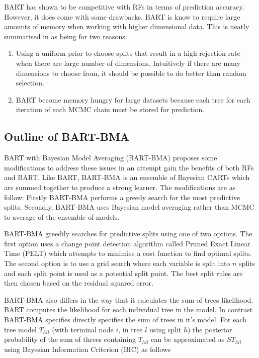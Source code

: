 \documentclass[journal]{IEEEtran}
\begin{document}
BART has shown to be competitive with RFs in terms of prediction accuracy. However, it does come with some drawbacks. BART is know to require large amounts of memory when working with higher dimensional data. This is neatly summarised in \cite{hernandez2015bayesian} as being for two reasons:

\begin{enumerate}
	\item Using a uniform prior to choose splits that result in a high rejection rate when there are large number of dimensions. Intuitively if there are many dimensions to choose from, it should be possible to do better than random selection.
	\item BART become memory hungry for large datasets because each tree for each iteration of each MCMC chain must be stored for prediction. 
\end{enumerate}

\subsection{Outline of BART-BMA}
BART with Bayesian Model Averaging (BART-BMA) \cite{hernandez2015bayesian} proposes some modifications to address these issues in an attempt gain the benefits of both RFs and BART. Like BART, BART-BMA is an ensemble of Bayesian CARTs which are summed together to produce a strong learner. The modifications are as follow: Firstly BART-BMA performs a greedy search for the most predictive splits. Secondly, BART-BMA uses Bayesian model averaging rather than MCMC to average of the ensemble of models.

BART-BMA greedily searches for predictive splits using one of two options. The first option uses a change point detection algorithm called Pruned Exact Linear Time (PELT) which attempts to minimise a cost function to find optimal splits. The second option is to use a grid search where each variable is split into $n$ splits and each split point is used as a potential split point. The best split rules are then chosen based on the residual squared error.

BART-BMA also differs in the way that it calculates the sum of trees likelihood. BART computes the likelihood for each individual tree in the model. In contrast BART-BMA specifies directly specifies the sum of trees in it's model. For each tree model $T_{hil}$ (with terminal node $i$, in tree $l$ using split $h$) the posterior probability of the sum of threes containing $T_{hil}$ can be approximated as $ST_{hil}$ using Bayesian Information Criterion (BIC) as follows
\end{document}
